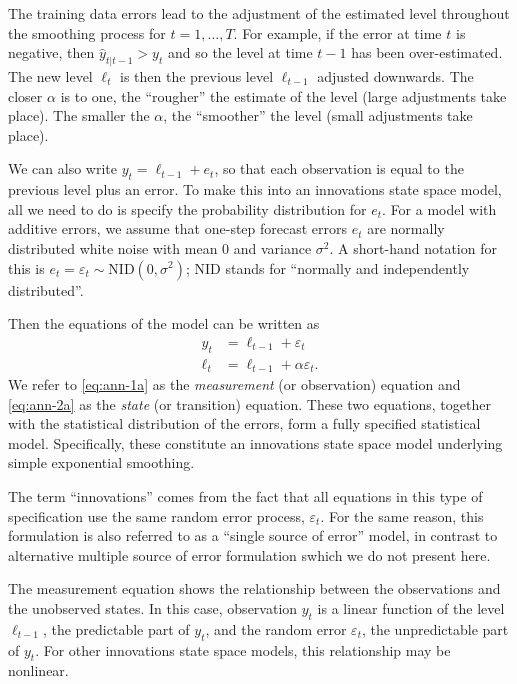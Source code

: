 \documentclass[]{book}
\begin{document}
The training data errors lead to the adjustment of the estimated level throughout the smoothing process for \(t=1,\dots,T\). For example, if the error at time \(t\) is negative, then \(\hat{y}_{t|t-1}>y_t\) and so the level at time \(t-1\) has been over-estimated. The new level \(\ell_t\) is then the previous level \(\ell_{t-1}\) adjusted downwards. The closer \(\alpha\) is to one, the ``rougher'' the estimate of the level (large adjustments take place). The smaller the \(\alpha\), the ``smoother'' the level (small adjustments take place).

We can also write \(y_t = \ell_{t-1} + e_t\), so that each observation is equal to the previous level plus an error. To make this into an innovations state space model, all we need to do is specify the probability distribution for \(e_t\). For a model with additive errors, we assume that one-step forecast errors \(e_t\) are normally distributed white noise with mean 0 and variance \(\sigma^2\). A short-hand notation for this is \(e_t = \varepsilon_t\sim\text{NID}(0,\sigma^2)\); NID stands for ``normally and independently distributed''.

Then the equations of the model can be written as
\begin{align}
  y_t &= \ell_{t-1} + \varepsilon_t \label{eq:ann-1a}\\
  \ell_t&=\ell_{t-1}+\alpha \varepsilon_t. \label{eq:ann-2a}
\end{align}
We refer to \eqref{eq:ann-1a} as the \emph{measurement} (or observation) equation and \eqref{eq:ann-2a} as the \emph{state} (or transition) equation. These two equations, together with the statistical distribution of the errors, form a fully specified statistical model. Specifically, these constitute an innovations state space model underlying simple exponential smoothing.

The term ``innovations'' comes from the fact that all equations in this type of specification use the same random error process, \(\varepsilon_t\). For the same reason, this formulation is also referred to as a ``single source of error'' model, in contrast to alternative multiple source of error formulation swhich we do not present here.

The measurement equation shows the relationship between the observations and the unobserved states. In this case, observation \(y_t\) is a linear function of the level \(\ell_{t-1}\), the predictable part of \(y_t\), and the random error \(\varepsilon_t\), the unpredictable part of \(y_t\). For other innovations state space models, this relationship may be nonlinear.
\end{document}
